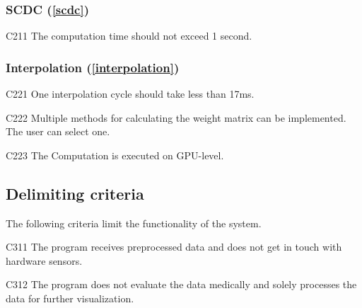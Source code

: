 \subsubsection{SCDC (\ref{scdc})}
	
	\begin{aims}
		
		\item[C211] The computation time should not exceed 1 second.
			
	\end{aims}
	
\subsubsection{Interpolation (\ref{interpolation})}

	\begin{aims}
	
		\item[C221] One interpolation cycle should take less than 17ms.
		\item[C222] Multiple methods for calculating the weight matrix can be implemented. The user can select one.
		\item[C223] The Computation is executed on GPU-level.
	
	\end{aims}
	
	
\subsection{Delimiting criteria} %
	
	The following criteria limit the functionality of the system.
	
	\begin{aims}
		
		\item[C311] The program receives preprocessed data and does not get in touch with hardware sensors.
		\item[C312] The program does not evaluate the data medically and solely processes the data for further 										visualization. 						
		
	\end{aims}
	



	
